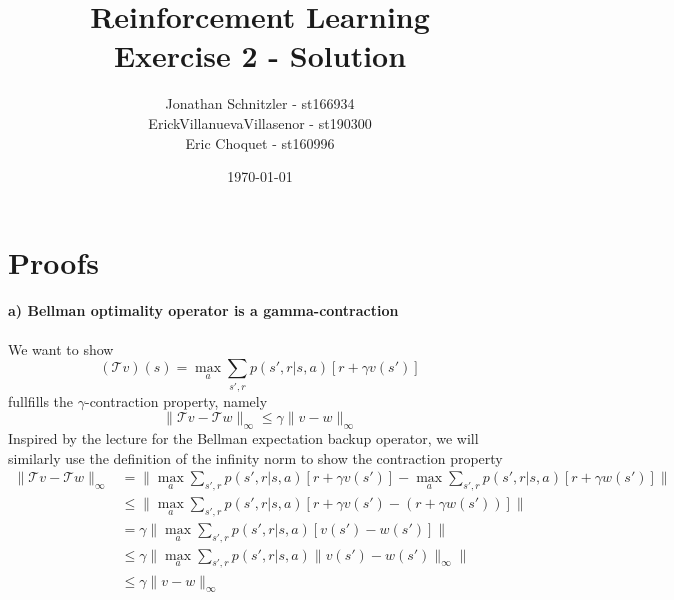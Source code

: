 \documentclass{article}
\title{Reinforcement Learning \\ Exercise 2 - Solution}
\author{Jonathan Schnitzler - st166934 \\
ErickVillanuevaVillasenor - st190300 \\
Eric Choquet - st160996}
\date{\today}
\begin{document}
\maketitle
\section*{Proofs}

\paragraph*{a) Bellman optimality operator is a gamma-contraction}
We want to show
\begin{equation}
    (\mathcal{T}v)(s) = \max_a \sum_{s', r} p(s', r|s,a)[r + \gamma v(s')]
\end{equation}
fullfills the $\gamma$-contraction property, namely
\begin{equation}
    \|\mathcal{T}v - \mathcal{T}w\|_\infty \leq \gamma \|v - w\|_\infty
\end{equation}
Inspired by the lecture for the Bellman expectation backup operator, we will similarly use the definition of the infinity norm to show the contraction property
\begin{align}
    \|\mathcal{T}v - \mathcal{T}w\|_\infty &= \| \max_a \sum_{s', r} p(s', r|s,a)[r + \gamma v(s')] - \max_a \sum_{s', r} p(s', r|s,a)[r + \gamma w(s')] \| \\
    &\leq \| \max_a \sum_{s', r} p(s', r|s,a)[r + \gamma v(s') - (r + \gamma w(s'))] \| \\
    &=\gamma \| \max_a \sum_{s', r} p(s', r|s,a) [v(s') - w(s')] \| \\
    &\leq \gamma \| \max_a \sum_{s', r} p(s', r|s,a) \|v(s') - w(s')\|_\infty \| \\
    &\leq \gamma \|v - w\|_\infty
\end{align}
\end{document}
